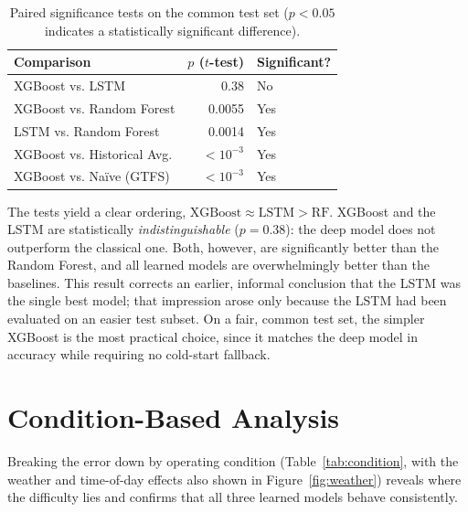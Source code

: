 \begin{table}[!htbp]
    \centering
    \caption{\label{tab:sig}Paired significance tests on the common test set ($p<0.05$ indicates a statistically significant difference).}
    \begin{tabular}{@{}lrl@{}}
        \toprule
        \textbf{Comparison} & \textbf{$p$ ($t$-test)} & \textbf{Significant?} \\
        \midrule
        XGBoost vs. LSTM            & 0.38   & No \\
        XGBoost vs. Random Forest   & 0.0055 & Yes \\
        LSTM vs. Random Forest      & 0.0014 & Yes \\
        XGBoost vs. Historical Avg. & $<10^{-3}$ & Yes \\
        XGBoost vs. Naïve (GTFS)    & $<10^{-3}$ & Yes \\
        \bottomrule
    \end{tabular}
\end{table}

The tests yield a clear ordering, $\text{XGBoost} \approx \text{LSTM} > \text{RF}$. XGBoost and the LSTM are statistically \emph{indistinguishable} ($p=0.38$): the deep model does not outperform the classical one. Both, however, are significantly better than the Random Forest, and all learned models are overwhelmingly better than the baselines. This result corrects an earlier, informal conclusion that the LSTM was the single best model; that impression arose only because the LSTM had been evaluated on an easier test subset. On a fair, common test set, the simpler XGBoost is the most practical choice, since it matches the deep model in accuracy while requiring no cold-start fallback.

\section{Condition-Based Analysis}

Breaking the error down by operating condition (Table~\ref{tab:condition}, with the weather and time-of-day effects also shown in Figure~\ref{fig:weather}) reveals where the difficulty lies and confirms that all three learned models behave consistently.

